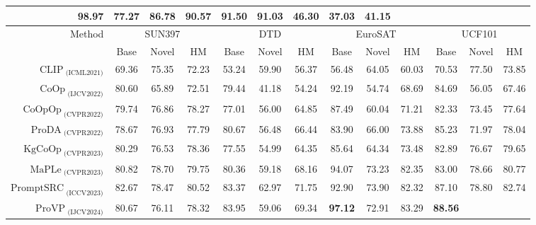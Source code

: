 \begin{table}[t]
{{\begin{tabular}{@{}r|ccc|ccc|ccc|ccc@{}}
      \textbf{98.97} &
      \textbf{77.27} &
      \textbf{86.78} &
      90.57 &
      91.50 &
      91.03 &
      46.30 &
      37.03 &
      \textbf{41.15} \\ \midrule \midrule
    \multirow{2}{*}{Method} &
      \multicolumn{3}{c|}{SUN397} &
      \multicolumn{3}{c|}{DTD} &
      \multicolumn{3}{c|}{EuroSAT} &
      \multicolumn{3}{c}{UCF101} \\
     &
      Base &
      Novel &
      HM &
      Base &
      Novel &
      HM &
      Base &
      Novel &
      HM &
      Base &
      Novel &
      HM \\ \midrule
    $\text{CLIP}_{\text{ (ICML2021)}}$ &
      69.36 &
      75.35 &
      72.23 &
      53.24 &
      59.90 &
      56.37 &
      56.48 &
      64.05 &
      60.03 &
      70.53 &
      77.50 &
      73.85 \\
    $\text{CoOp}_{\text{ (IJCV2022)}}$ &
      80.60 &
      65.89 &
      72.51 &
      79.44 &
      41.18 &
      54.24 &
      92.19 &
      54.74 &
      68.69 &
      84.69 &
      56.05 &
      67.46 \\
    $\text{CoOpOp}_{\text{ (CVPR2022)}}$ &
      79.74 &
      76.86 &
      78.27 &
      77.01 &
      56.00 &
      64.85 &
      87.49 &
      60.04 &
      71.21 &
      82.33 &
      73.45 &
      77.64 \\
    $\text{ProDA}_{\text{ (CVPR2022)}}$ &
      78.67 &
      76.93 &
      77.79 &
      80.67 &
      56.48 &
      66.44 &
      83.90 &
      66.00 &
      73.88 &
      85.23 &
      71.97 &
      78.04 \\
    $\text{KgCoOp}_{\text{ (CVPR2023)}}$ &
      80.29 &
      76.53 &
      78.36 &
      77.55 &
      54.99 &
      64.35 &
      85.64 &
      64.34 &
      73.48 &
      82.89 &
      76.67 &
      79.65 \\
    $\text{MaPLe}_{\text{ (CVPR2023)}}$ &
      80.82 &
      78.70 &
      79.75 &
      80.36 &
      59.18 &
      68.16 &
      94.07 &
      73.23 &
      82.35 &
      83.00 &
      78.66 &
      80.77 \\
    $\text{PromptSRC}_{\text{ (ICCV2023)}}$ &
      82.67 &
      78.47 &
      80.52 &
      83.37 &
      62.97 &
      71.75 &
      92.90 &
      73.90 &
      82.32 &
      87.10 &
      78.80 &
      82.74 \\
    $\text{ProVP}_{\text{ (IJCV2024)}}$ &
      80.67 &
      76.11 &
      78.32 &
      83.95 &
      59.06 &
      69.34 &
      \textbf{97.12} &
      72.91 &
      83.29 &
      \textbf{88.56} &

\end{tabular}}}
\end{table}
